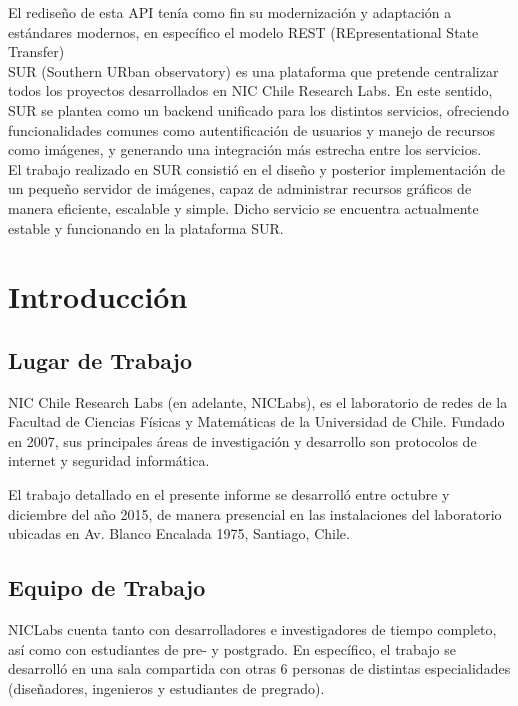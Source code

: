 \documentclass[11pt,letterpaper]{article}
\begin{document}
El rediseño de esta API tenía como fin su modernización y adaptación a estándares modernos, en específico el modelo REST (REpresentational State Transfer)\\

SUR (Southern URban observatory) es una plataforma que pretende centralizar todos los proyectos desarrollados en NIC Chile Research Labs. En este sentido, SUR se plantea como un backend unificado para los distintos servicios, ofreciendo funcionalidades comunes como autentificación de usuarios y manejo de recursos como imágenes, y generando una integración más estrecha entre los servicios.\\

El trabajo realizado en SUR consistió en el diseño y posterior implementación de un pequeño servidor de imágenes, capaz de administrar recursos gráficos de manera eficiente, escalable y simple. Dicho servicio se encuentra actualmente estable y funcionando en la plataforma SUR.
\newpage
\section{Introducción}
\subsection{Lugar de Trabajo}

NIC Chile Research Labs (en adelante, NICLabs)\cite{niclabs}, es el laboratorio de redes de la Facultad de Ciencias Físicas y Matemáticas de la Universidad de Chile. Fundado en 2007, sus principales áreas de investigación y desarrollo son protocolos de internet y seguridad informática.

El trabajo detallado en el presente informe se desarrolló entre octubre y diciembre del año 2015, de manera presencial en las instalaciones del laboratorio ubicadas en Av. Blanco Encalada 1975, Santiago, Chile.

\subsection{Equipo de Trabajo}


NICLabs cuenta tanto con desarrolladores e investigadores de tiempo completo, así como con estudiantes de pre- y postgrado. En específico, el trabajo se desarrolló en una sala compartida con otras 6 personas de distintas especialidades (diseñadores, ingenieros y estudiantes de pregrado).
\end{document}
